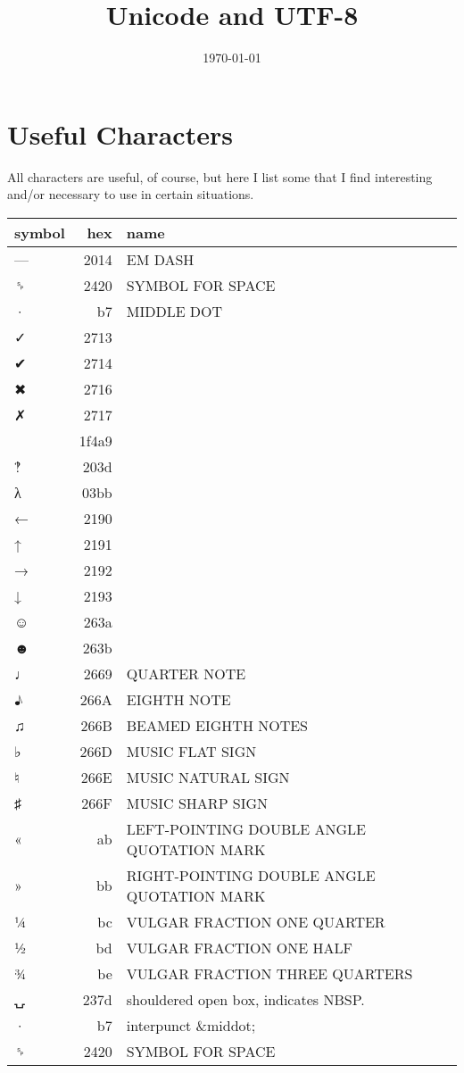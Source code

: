 \documentclass[11pt]{article}
\date{\today}
\title{Unicode and UTF-8}
\begin{document}
\maketitle
\tableofcontents


\section{Useful Characters}
\label{sec:org1bcf6dc}

All characters are useful, of course, but here I list some that I find
interesting and/or necessary to use in certain situations.

\begin{center}
\begin{tabular}{lrl}
symbol & hex & name\\[0pt]
\hline
— & 2014 & EM DASH\\[0pt]
␠ & 2420 & SYMBOL FOR SPACE\\[0pt]
· & b7 & MIDDLE DOT\\[0pt]
✓ & 2713 & \\[0pt]
✔ & 2714 & \\[0pt]
✖ & 2716 & \\[0pt]
✗ & 2717 & \\[0pt]
💩 & 1f4a9 & \\[0pt]
‽ & 203d & \\[0pt]
λ & 03bb & \\[0pt]
← & 2190 & \\[0pt]
↑ & 2191 & \\[0pt]
→ & 2192 & \\[0pt]
↓ & 2193 & \\[0pt]
☺ & 263a & \\[0pt]
☻ & 263b & \\[0pt]
♩ & 2669 & QUARTER NOTE\\[0pt]
♪ & 266A & EIGHTH NOTE\\[0pt]
♫ & 266B & BEAMED EIGHTH NOTES\\[0pt]
♭ & 266D & MUSIC FLAT SIGN\\[0pt]
♮ & 266E & MUSIC NATURAL SIGN\\[0pt]
♯ & 266F & MUSIC SHARP SIGN\\[0pt]
« & ab & LEFT-POINTING DOUBLE ANGLE QUOTATION MARK\\[0pt]
» & bb & RIGHT-POINTING DOUBLE ANGLE QUOTATION MARK\\[0pt]
¼ & bc & VULGAR FRACTION ONE QUARTER\\[0pt]
½ & bd & VULGAR FRACTION ONE HALF\\[0pt]
¾ & be & VULGAR FRACTION THREE QUARTERS\\[0pt]
⍽ & 237d & shouldered open box, indicates NBSP.\\[0pt]
· & b7 & interpunct \&middot;\\[0pt]
␠ & 2420 & SYMBOL FOR SPACE\\[0pt]
\end{tabular}
\end{center}
\end{document}
